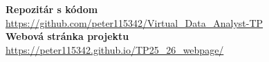 \documentclass[a4paper,12pt]{article}
\begin{document}
\begin{center}
{\Large\textbf{Repozitár s kódom}}\\[0.5cm]
\normalsize
\url{https://github.com/peter115342/Virtual_Data_Analyst-TP}\\[0.5cm]
{\Large\textbf{Webová stránka projektu}}\\[0.5cm]
\normalsize
\url{https://peter115342.github.io/TP25_26_webpage/}
\end{center}
\end{document}
